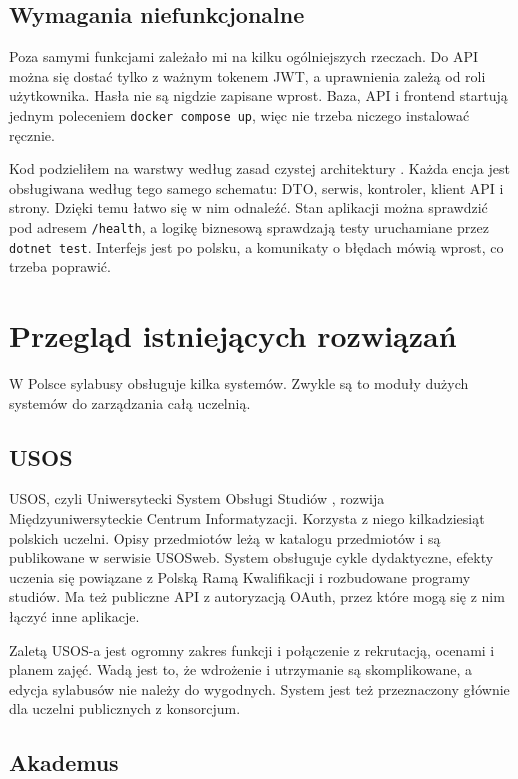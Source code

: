 \documentclass[times]{san}
\begin{document}
\subsection{Wymagania niefunkcjonalne}

Poza samymi funkcjami zależało mi na kilku ogólniejszych rzeczach. Do API można się dostać tylko z ważnym tokenem JWT, a uprawnienia zależą od roli użytkownika. Hasła nie są nigdzie zapisane wprost. Baza, API i frontend startują jednym poleceniem \texttt{docker compose up}, więc nie trzeba niczego instalować ręcznie.

Kod podzieliłem na warstwy według zasad czystej architektury \cite{martin_clean}. Każda encja jest obsługiwana według tego samego schematu: DTO, serwis, kontroler, klient API i strony. Dzięki temu łatwo się w nim odnaleźć. Stan aplikacji można sprawdzić pod adresem \texttt{/health}, a logikę biznesową sprawdzają testy uruchamiane przez \texttt{dotnet test}. Interfejs jest po polsku, a komunikaty o błędach mówią wprost, co trzeba poprawić.

\section{Przegląd istniejących rozwiązań}

W Polsce sylabusy obsługuje kilka systemów. Zwykle są to moduły dużych systemów do zarządzania całą uczelnią.

\subsection{USOS}

USOS, czyli Uniwersytecki System Obsługi Studiów \cite{usos}, rozwija Międzyuniwersyteckie Centrum Informatyzacji. Korzysta z niego kilkadziesiąt polskich uczelni. Opisy przedmiotów leżą w katalogu przedmiotów i są publikowane w serwisie USOSweb. System obsługuje cykle dydaktyczne, efekty uczenia się powiązane z Polską Ramą Kwalifikacji i rozbudowane programy studiów. Ma też publiczne API \cite{usos_api} z autoryzacją OAuth, przez które mogą się z nim łączyć inne aplikacje.

Zaletą USOS-a jest ogromny zakres funkcji i połączenie z rekrutacją, ocenami i planem zajęć. Wadą jest to, że wdrożenie i utrzymanie są skomplikowane, a edycja sylabusów nie należy do wygodnych. System jest też przeznaczony głównie dla uczelni publicznych z konsorcjum.

\subsection{Akademus}
\end{document}
